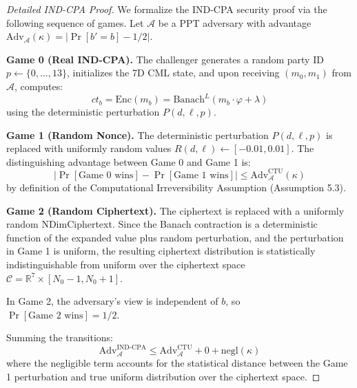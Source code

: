 \documentclass[11pt,a4paper]{article}
\begin{document}
\begin{proof}[Detailed IND-CPA Proof]
We formalize the IND-CPA security proof via the following sequence of games. Let $\mathcal{A}$ be a PPT adversary with advantage $\text{Adv}_{\mathcal{A}}(\kappa) = |\Pr[b' = b] - 1/2|$.

\textbf{Game 0 (Real IND-CPA).} The challenger generates a random party ID $p \leftarrow \{0,\ldots,13\}$, initializes the 7D CML state, and upon receiving $(m_0, m_1)$ from $\mathcal{A}$, computes:
\begin{equation}
    ct_b = \text{Enc}(m_b) = \text{Banach}^L(m_b \cdot \varphi + \lambda)
\end{equation}
using the deterministic perturbation $P(d,\ell,p)$.

\textbf{Game 1 (Random Nonce).} The deterministic perturbation $P(d,\ell,p)$ is replaced with uniformly random values $R(d,\ell) \leftarrow [-0.01, 0.01]$. The distinguishing advantage between Game 0 and Game 1 is:
\begin{equation}
    |\Pr[\text{Game 0 wins}] - \Pr[\text{Game 1 wins}]| \leq \text{Adv}^{\text{CTU}}_{\mathcal{A}}(\kappa)
\end{equation}
by definition of the Computational Irreversibility Assumption (Assumption 5.3).

\textbf{Game 2 (Random Ciphertext).} The ciphertext is replaced with a uniformly random NDimCiphertext. Since the Banach contraction is a deterministic function of the expanded value plus random perturbation, and the perturbation in Game 1 is uniform, the resulting ciphertext distribution is statistically indistinguishable from uniform over the ciphertext space $\mathcal{C} = \mathbb{R}^7 \times [N_0-1, N_0+1]$.

In Game 2, the adversary's view is independent of $b$, so $\Pr[\text{Game 2 wins}] = 1/2$.

Summing the transitions:
\begin{equation}
    \text{Adv}^{\text{IND-CPA}}_{\mathcal{A}} \leq \text{Adv}^{\text{CTU}}_{\mathcal{A}} + 0 + \text{negl}(\kappa)
\end{equation}
where the negligible term accounts for the statistical distance between the Game 1 perturbation and true uniform distribution over the ciphertext space.
\end{proof}
\end{document}
